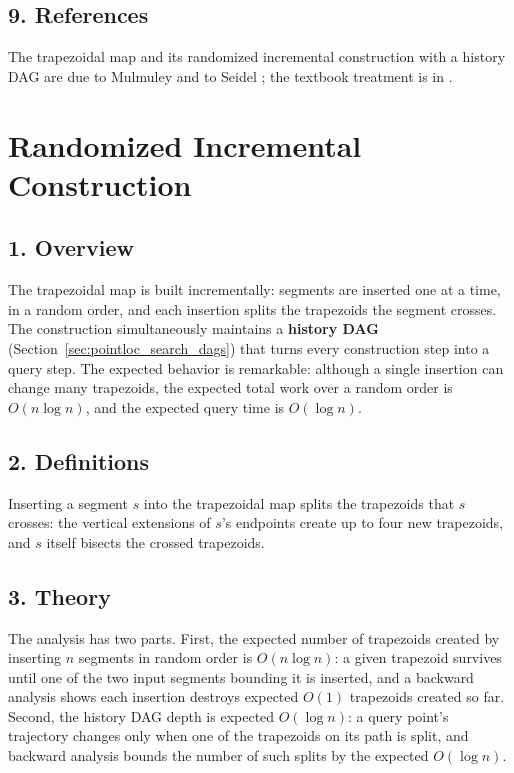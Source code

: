 \subsection{9. References}

The trapezoidal map and its randomized incremental construction with a
history DAG are due to Mulmuley and to Seidel \cite{seidel1991}; the
textbook treatment is in \cite{berg2008}.

\section{Randomized Incremental Construction}
\label{sec:pointloc_randomized}

\subsection{1. Overview}

The trapezoidal map is built incrementally: segments are inserted one at a
time, in a random order, and each insertion splits the trapezoids the
segment crosses. The construction simultaneously maintains a \textbf{history
DAG} (Section~\ref{sec:pointloc_search_dags}) that turns
every construction step into a query step. The expected behavior is
remarkable: although a single insertion can change many trapezoids, the
expected total work over a random order is $O(n \log n)$, and the expected
query time is $O(\log n)$.

\subsection{2. Definitions}

\begin{definition}\label{def:pointloc_insertion}
  Inserting a segment $s$ into the trapezoidal map splits the trapezoids
  that $s$ crosses: the vertical extensions of $s$'s endpoints create up to
  four new trapezoids, and $s$ itself bisects the crossed trapezoids.
\end{definition}

\subsection{3. Theory}

The analysis has two parts. First, the expected number of trapezoids created
by inserting $n$ segments in random order is $O(n \log n)$: a given
trapezoid survives until one of the two input segments bounding it is
inserted, and a backward analysis shows each insertion destroys expected
$O(1)$ trapezoids created so far. Second, the history DAG depth is expected
$O(\log n)$: a query point's trajectory changes only when one of the
trapezoids on its path is split, and backward analysis bounds the number of
such splits by the expected $O(\log n)$.

